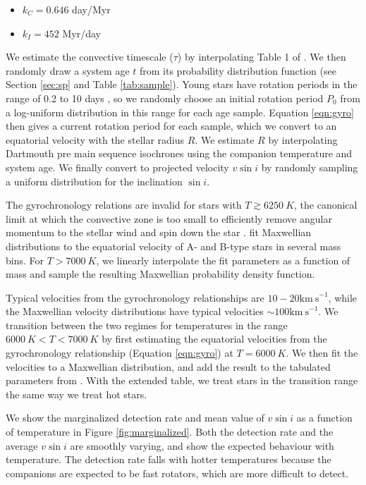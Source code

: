 \documentclass{emulateapj}
\begin{document}
\begin{itemize}
\item $k_C = 0.646$ day/Myr
\item $k_I = 452$ Myr/day
\end{itemize}
We estimate the convective timescale ($\tau$) by interpolating Table 1 of \citet{Barnes2010a}. We then randomly draw a system age $t$ from its probability distribution function (see Section \ref{sec:sp} and Table \ref{tab:sample}). Young stars have rotation periods in the range of 0.2 to 10 days \citep{Bouvier2014}, so we randomly choose an initial rotation period $P_0$ from a log-uniform distribution in this range for each age sample. Equation \ref{eqn:gyro} then gives a current rotation period for each sample, which we convert to an equatorial velocity with the stellar radius $R$. We estimate $R$ by interpolating Dartmouth pre main sequence isochrones \citep{Dotter2008} using the companion temperature and system age. We finally convert to projected velocity $v\sin{i}$ by randomly sampling a uniform distribution for the inclination $\sin{i}$.

The gyrochronology relations are invalid for stars with $T \gtrsim 6250\ K$, the canonical limit at which the convective zone is too small to efficiently remove angular momentum to the stellar wind and spin down the star \citep{Pinsonneault2001}. \citet{Zorec2012} fit Maxwellian distributions to the equatorial velocity of A- and B-type stars in several mass bins. For $T > 7000\ K$, we linearly interpolate the fit parameters as a function of mass and sample the resulting Maxwellian probability density function. 

Typical velocities from the gyrochronology relationships are $10-20 \mathrm{km\ s}^{-1}$, while the Maxwellian velocity distributions have typical velocities $\sim 100 \mathrm{km\ s}^{-1}$. We transition between the two regimes for temperatures in the range $6000\ K < T < 7000\ K$ by first estimating the equatorial velocities from the gyrochronology relationship (Equation \ref{eqn:gyro}) at $T=6000\ K$. We then fit the velocities to a Maxwellian distribution, and add the result to the tabulated parameters from \citep{Zorec2012}. With the extended table, we treat stars in the transition range the same way we treat hot stars.
 
We show the marginalized detection rate and mean value of $v\sin{i}$ as a function of temperature in Figure \ref{fig:marginalized}. Both the detection rate and the average $v\sin{i}$ are smoothly varying, and show the expected behaviour with temperature. The detection rate falls with hotter temperatures because the companions are expected to be fast rotators, which are more difficult to detect. 
\end{document}
